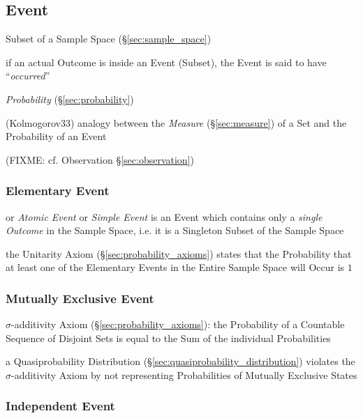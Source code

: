 \subsection{Event}\label{sec:probability_event}

Subset of a Sample Space (\S\ref{sec:sample_space})

if an actual Outcome is inside an Event (Subset), the Event is said to have
``\emph{occurred}''

\emph{Probability} (\S\ref{sec:probability})

(Kolmogorov33) analogy between the \emph{Measure} (\S\ref{sec:measure}) of a Set
and the Probability of an Event

(FIXME: cf. Observation \S\ref{sec:observation})



\subsubsection{Elementary Event}\label{sec:elementary_event}

or \emph{Atomic Event} or \emph{Simple Event} is an Event which contains only a
\emph{single Outcome} in the Sample Space, i.e. it is a Singleton Subset of the
Sample Space

the Unitarity Axiom (\S\ref{sec:probability_axioms}) states that the
Probability that at least one of the Elementary Events in the Entire Sample
Space will Occur is $1$



\subsubsection{Mutually Exclusive Event}\label{sec:mutually_exclusive}

$\sigma$-additivity Axiom (\S\ref{sec:probability_axioms}): the Probability of
a Countable Sequence of Disjoint Sets is equal to the Sum of the individual
Probabilities

a Quasiprobability Distribution (\S\ref{sec:quasiprobability_distribution})
violates the $\sigma$-additivity Axiom by not representing Probabilities of
Mutually Exclusive States



\subsubsection{Independent Event}\label{sec:independent_event}

